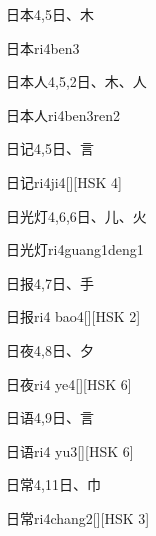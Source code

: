 \begin{Entry}{日本}{4,5}{⽇、⽊}
  \begin{Phonetics}{日本}{ri4ben3}
  \end{Phonetics}
\end{Entry}

\begin{Entry}{日本人}{4,5,2}{⽇、⽊、⼈}
  \begin{Phonetics}{日本人}{ri4ben3ren2}
  \end{Phonetics}
\end{Entry}

\begin{Entry}{日记}{4,5}{⽇、⾔}
  \begin{Phonetics}{日记}{ri4ji4}[][HSK 4]
  \end{Phonetics}
\end{Entry}

\begin{Entry}{日光灯}{4,6,6}{⽇、⼉、⽕}
  \begin{Phonetics}{日光灯}{ri4guang1deng1}
  \end{Phonetics}
\end{Entry}

\begin{Entry}{日报}{4,7}{⽇、⼿}
  \begin{Phonetics}{日报}{ri4 bao4}[][HSK 2]
  \end{Phonetics}
\end{Entry}

\begin{Entry}{日夜}{4,8}{⽇、⼣}
  \begin{Phonetics}{日夜}{ri4 ye4}[][HSK 6]
  \end{Phonetics}
\end{Entry}

\begin{Entry}{日语}{4,9}{⽇、⾔}
  \begin{Phonetics}{日语}{ri4 yu3}[][HSK 6]
  \end{Phonetics}
\end{Entry}

\begin{Entry}{日常}{4,11}{⽇、⼱}
  \begin{Phonetics}{日常}{ri4chang2}[][HSK 3]
  \end{Phonetics}
\end{Entry}

